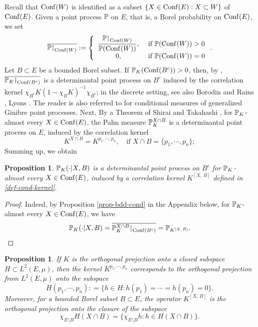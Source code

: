 \documentclass[12pt]{paper}
\newtheorem{proposition}[theorem]{Proposition}
\numberwithin{theorem}{section}
\numberwithin{figure}{section}
\numberwithin{equation}{section}
\begin{document}
Recall that $\mathrm{Conf}(W)$ is identified as a subset $\{X \in \mathrm{Conf}(E): X \subset W\}$ of $\mathrm{Conf}(E)$.  Given a point process $\mathbb{P}$ on $E$, that is, a Borel probability on $\mathrm{Conf}(E)$, we set
\begin{align}\label{nor-res}
\overline{\mathbb{P}\mathord{\upharpoonright}_{\mathrm{Conf}(W)}}: = \left\{ \begin{array}{cc} \displaystyle \frac{\mathbb{P}\mathord{\upharpoonright}_{\mathrm{Conf}(W)}}{\mathbb{P}(\mathrm{Conf}(W))}, &\text{ if $\mathbb{P}(\mathrm{Conf}(W)) >0$}
\\
0, &\text{ if $\mathbb{P}(\mathrm{Conf}(W)) =0$}
\end{array}
\right..
\end{align}
Let $B\subset E$ be a bounded Borel subset.   If $\mathbb{P}_K(\mathrm{Conf}(B^c))>0$, then, by \cite[Proposition 2.1]{Buf-inf},
 $\overline{\mathbb{P}_K\mathord{\upharpoonright}_{\mathrm{Conf}(B^c)}}$ is a determinantal point process on $B^c$ induced by the correlation kernel $\chi_{B^c} K ( 1 - \chi_B K)^{-1}  \chi_{B^c}$; in the discrete setting, see also Borodin and Rains \cite{BorRains}, Lyons \cite{DPP-L}. The reader is also referred to \cite{BQ-JFA} for conditional measures of generalized Ginibre point processes.  Next,  By a Theorem of Shirai and Takahashi \cite[Theorem 1.7]{ST-palm},  for $\mathbb{P}_K$-almost every $X \in \mathrm{Conf}(E)$, the Palm measure $\mathbb{P}_K^{X\cap B}$ is a determinantal point process on $E$,  induced by the  correlation kernel
\[
K^{X\cap B} = K^{p_1, \cdots, p_n}, \quad \text{if $X \cap B = \{p_1, \cdots, p_n\}$} ;
\]
Summing up, we obtain
\begin{proposition}\label{prop-DPP}
  $\mathbb{P}_K(\cdot|X, B)$ is a determinantal point process on $B^c$  for $\mathbb{P}_K$-almost every $X \in \mathrm{Conf}(E)$,  induced by a correlation kernel $K^{[X, \, B]}$ defined in \eqref{def-cond-kernel}.
\end{proposition}

\begin{proof}
Indeed, by Proposition \ref{prop-bdd-cond} in the Appendix  below,  for $\mathbb{P}_K$-almost every $X \in \mathrm{Conf}(E)$, we have
\[
 \mathbb{P}_K(\cdot | X, B) = \overline{\mathbb{P}_K^{X\cap B}\mathord{\upharpoonright}_{\mathrm{Conf}(B^c)}} = \mathbb{P}_{K^{[X, \, B]}}.
 \]
\end{proof}


\begin{proposition}
If  $K$ is the orthogonal projection onto a closed subspace $H \subset L^2(E, \mu)$, then  the kernel $K^{p_1, \cdots, p_n}$ corresponds to the orthogonal projection from $L^2(E, \mu)$ onto the subspace
\[
H(p_1, \cdots, p_n):  = \{h \in H: h(p_1) = \cdots = h(p_n) = 0 \}.
\]
Moreover, for a bounded Borel subset $B\subset E$, the operator $K^{[X, \, B]}$ is the orthogonal projection onto the closure of the subspace
\[
\chi_{E\setminus B} H(X \cap B) = \{\chi_{E\setminus B} h: h \in H(X\cap B)\}.
\]
\end{proposition}
\end{document}
